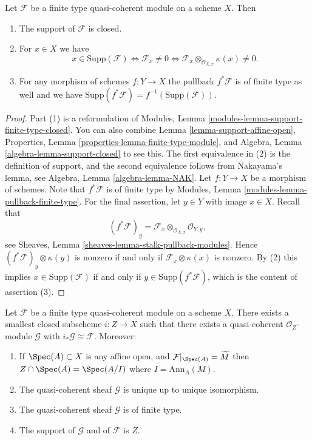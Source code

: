 \begin{lemma}
\label{lemma-support-finite-type}
Let $\mathcal{F}$ be a finite type quasi-coherent module
on a scheme $X$. Then
\begin{enumerate}
\item The support of $\mathcal{F}$ is closed.
\item For $x \in X$ we have
$$
x \in \text{Supp}(\mathcal{F})
\Leftrightarrow
\mathcal{F}_x \not = 0
\Leftrightarrow
\mathcal{F}_x \otimes_{\mathcal{O}_{X, x}} \kappa(x) \not = 0.
$$
\item For any morphism of schemes $f : Y \to X$ the pullback
$f^*\mathcal{F}$ is of finite type as well and we have
$\text{Supp}(f^*\mathcal{F}) = f^{-1}(\text{Supp}(\mathcal{F}))$.
\end{enumerate}
\end{lemma}

\begin{proof}
Part (1) is a reformulation of
Modules, Lemma \ref{modules-lemma-support-finite-type-closed}.
You can also combine
Lemma \ref{lemma-support-affine-open},
Properties, Lemma \ref{properties-lemma-finite-type-module},
and
Algebra, Lemma \ref{algebra-lemma-support-closed}
to see this. The first equivalence in (2) is the definition
of support, and the second equivalence follows from
Nakayama's lemma, see
Algebra, Lemma \ref{algebra-lemma-NAK}.
Let $f : Y \to X$ be a morphism of schemes. Note that
$f^*\mathcal{F}$ is of finite type by
Modules, Lemma \ref{modules-lemma-pullback-finite-type}.
For the final assertion, let $y \in Y$ with image $x \in X$.
Recall that
$$
(f^*\mathcal{F})_y =
\mathcal{F}_x \otimes_{\mathcal{O}_{X, x}} \mathcal{O}_{Y, y},
$$
see
Sheaves, Lemma \ref{sheaves-lemma-stalk-pullback-modules}.
Hence $(f^*\mathcal{F})_y \otimes \kappa(y)$ is nonzero
if and only if $\mathcal{F}_x \otimes \kappa(x)$ is nonzero.
By (2) this implies $x \in \text{Supp}(\mathcal{F})$ if and only
if $y \in \text{Supp}(f^*\mathcal{F})$, which is the content of
assertion (3).
\end{proof}

\begin{lemma}
\label{lemma-scheme-theoretic-support}
Let $\mathcal{F}$ be a finite type quasi-coherent module
on a scheme $X$. There exists a smallest closed subscheme
$i : Z \to X$ such that there exists a quasi-coherent
$\mathcal{O}_Z$-module $\mathcal{G}$ with
$i_*\mathcal{G} \cong \mathcal{F}$. Moreover:
\begin{enumerate}
\item If $\Spec(A) \subset X$ is any affine open, and
$\mathcal{F}|_{\Spec(A)} = \widetilde{M}$ then
$Z \cap \Spec(A) = \Spec(A/I)$ where $I = \text{Ann}_A(M)$.
\item The quasi-coherent sheaf $\mathcal{G}$ is unique up to unique
isomorphism.
\item The quasi-coherent sheaf $\mathcal{G}$ is of finite type.
\item The support of $\mathcal{G}$ and of $\mathcal{F}$ is $Z$.
\end{enumerate}
\end{lemma}

